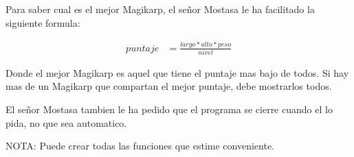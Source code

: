 Para saber cual es el mejor Magikarp, el señor Mostasa le ha facilitado la siguiente formula:

\begin{center}
	\begin{align*}
		puntaje &= \frac{largo * alto * peso}{nivel}
	\end{align*}
\end{center}

Donde el mejor Magikarp es aquel que tiene el puntaje mas bajo de todos. Si hay mas de un Magikarp que compartan el mejor puntaje, debe mostrarlos todos. 

El señor Mostasa tambien le ha pedido que el programa se cierre cuando el lo pida, no que sea automatico.

NOTA: Puede crear todas las funciones que estime conveniente.
